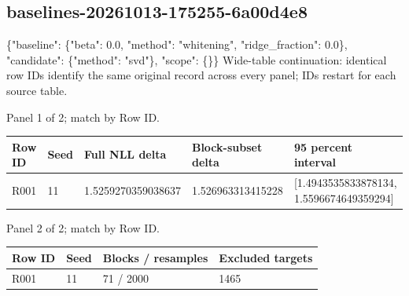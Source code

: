 \documentclass[10pt]{article}
\begin{document}
\subsection{baselines-20261013-175255-6a00d4e8}
\{"baseline": \{"beta": 0.0, "method": "whitening", "ridge\_fraction": 0.0\}, "candidate": \{"method": "svd"\}, "scope": \{\}\}
Wide-table continuation: identical row IDs identify the same original record across every panel; IDs restart for each source table.
\par\noindent Panel 1 of 2; match by Row ID.
{\scriptsize\setlength{\tabcolsep}{2pt}
\begin{longtable}{p{}p{}p{}p{}p{}}
Row ID & Seed & Full NLL delta & Block-subset delta & 95 percent interval \\
\hline\endhead
R001 & 11 & 1.5259270359038637 & 1.526963313415228 & [1.4943535833878134, 1.5596674649359294] \\
\end{longtable}}
\par\noindent Panel 2 of 2; match by Row ID.
{\scriptsize\setlength{\tabcolsep}{2pt}
\begin{longtable}{p{}p{}p{}p{}}
Row ID & Seed & Blocks / resamples & Excluded targets \\
\hline\endhead
R001 & 11 & 71 / 2000 & 1465 \\
\end{longtable}}
\end{document}
